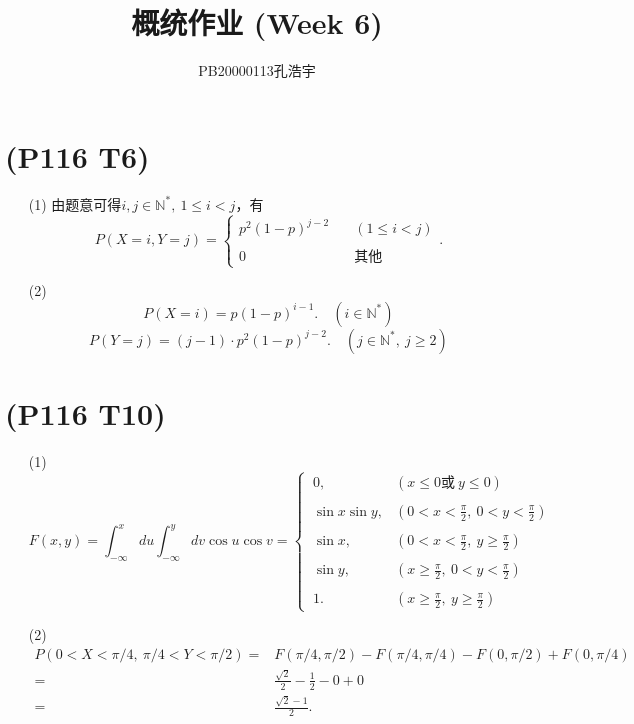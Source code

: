 \documentclass{article}
\title{概统作业 (Week 6)}
\author{PB20000113孔浩宇}
\begin{document}
\maketitle
\section{(P116 T6)}  %
\begin{enumerate}
    \item [(1)]由题意可得$i,j \in \mathbb{N}^{*},\ 1\leq i < j $，有
    \[
        P(X=i, Y=j)=
        \begin{cases}
            p^2 {(1-p)}^{j-2}   \quad &(1\leq i < j)\\
            \\
            0   &\mbox{其他}
        \end{cases}.
    \]
    \item [(2)]
    \[
        P(X=i) = p {(1-p)}^{i-1}.
        \quad (i\in \mathbb{N}^{*})
    \]
    \[
        P(Y=j) = (j-1) \cdot p^{2} {(1-p)}^{j-2} .  
        \quad (j\in \mathbb{N}^{*},\ j\geq 2)
    \]
\end{enumerate}

\section{(P116 T10)}  %
\begin{enumerate}
    \item [(1)]
    \[
        F(x,y) =  \int_{-\infty}^{x} du \int_{-\infty}^{y} dv \cos{u} \cos{v}
        = \begin{cases}
            \ 0,    & (x\leq 0\mbox{或}\ y\leq 0)\\
            \\
            \ \sin{x} \sin{y},    & (0<x<\displaystyle{\frac{\pi}{2}},\ 0<y<\displaystyle{\frac{\pi}{2}}) \\
            \\
            \ \sin{x},    & (0<x<\displaystyle{\frac{\pi}{2}},\ y\geq \displaystyle{\frac{\pi}{2}})\\
            \\
            \ \sin{y},    & (x\geq \displaystyle{\frac{\pi}{2}},\ 0<y<\displaystyle{\frac{\pi}{2}})\\
            \\
            \ 1.  & (x\geq \displaystyle{\frac{\pi}{2}},\ y\geq \displaystyle{\frac{\pi}{2}})
        \end{cases}
    \]
    \item [(2)]
    \[
        \begin{aligned}
            P(0< X <\pi /4,\ \pi /4 < Y < \pi /2)
            =&
            F(\pi /4, \pi /2) - F(\pi /4, \pi/4) - F(0, \pi /2) + F(0, \pi /4)\\
            =&  
            \displaystyle{\frac{\sqrt{2}}{2} - \frac{1}{2} - 0 + 0}\\
            =&
            \displaystyle{\frac{\sqrt{2}-1}{2}}.
        \end{aligned}
    \]
\end{enumerate}
\end{document}
